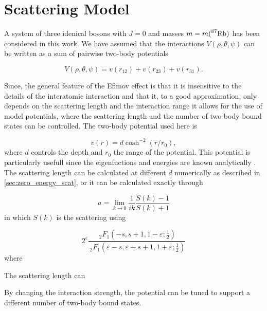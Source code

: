 \chapter{Scattering Model}
A system of three idenical bosons with $J=0$ and masses $m = m( \prescript{87}{}{\mathrm{Rb}})$ has been considered in this work. We have assumed that the interactions $V(\rho,\theta,\psi)$ can be written as a sum of pairwise two-body potentials   

\begin{equation}\label{eq:potential_sum}
V(\rho,\theta,\psi) = v(r_{12}) + v(r_{23}) + v(r_{31}).
\end{equation} 

Since, the general feature of the Efimov effect is that it is insensitive to the details of the interatomic interaction and that it, to a good approximation, only depends on the scattering length and the interaction range it allows for the use of model potentials, where the scattering length and the number of two-body bound states can be controlled. The two-body potential used here is  

\begin{equation}\label{eq:two_b_potential}
v(r) = d\cosh^{-2}{(r/r_0)},
\end{equation}
where $d$ controls the depth and $r_0$ the range of the potential.
This potential is particularly usefull since the eigenfuctions and energies are known analytically \cite{Landau1965Quantum}. The scattering length can be calculated at different $d$ numerically as described in \cref{sec:zero_energy_scat}, or it can be calculated exactly through 

\begin{equation}
a = \lim_{k \to 0} \frac{1}{ik} \frac{S(k)-1}{S(k)+1}
\end{equation}
in which $S(k)$ is the scattering  using 

\begin{equation}
2^{\varepsilon} \frac{\,_2F_1(-s, s+1, 1-\varepsilon;\frac{1}{2})}{\,_2F_1(\varepsilon-s, \varepsilon + s+1, 1+\varepsilon;\frac{1}{2})}
\end{equation}
where 

The scattering length can  

By changing the interaction strength, the potential can be tuned to support a different number of two-body bound states.   

